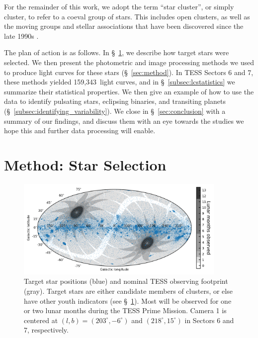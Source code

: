 \documentclass[12pt,twocolumn,tighten,trackchanges]{aastex62}
\newcommand{\numberlcs}{159{,}343\ } %
\begin{document}
For the remainder of this work, we adopt the term ``star cluster'', or
simply cluster, to refer to a coeval group of stars.  This includes
open clusters, as well as the moving groups and stellar associations
that have been discovered since the late 1990s
\citep{zuckerman_young_2004}. 

The plan of action is as follows. In \S~\ref{sec:starselection}, we
describe how target stars were selected. We then present the
photometric and image processing methods we used to produce light
curves for these stars (\S~\ref{sec:method}).  In TESS Sectors 6 and
7, these methods yielded \numberlcs light curves, and in
\S~\ref{subsec:lcstatistics} we summarize their statistical
properties.  We then give an example of how to use the data to identify
pulsating stars, eclipsing binaries, and transiting planets
(\S~\ref{subsec:identifying_variability}).  We close in
\S~\ref{sec:conclusion} with a summary of our findings, and discuss them
with an eye towards the studies we hope this and further data
processing will enable.


\section{Method: Star Selection}
\label{sec:starselection}

\begin{figure}[!t]
	\begin{center}
		\leavevmode
		\includegraphics[width=0.9\textwidth]{target_star_positions.png}
	\end{center}
	\vspace{-0.5cm}
	\caption{
    Target star positions (blue) and nominal TESS observing footprint
    (gray).  Target stars are either candidate members of clusters, or
    else have other youth indicators (see \S~\ref{sec:starselection}).
    Most will be observed for one or two lunar months during the TESS
    Prime Mission.  Camera 1 is centered at $(l,b)=(203^\circ,
    -6^\circ)$ and $(218^\circ,15^\circ)$ in Sectors 6 and 7,
    respectively.
    \label{fig:cdips_targets_positions}
	}
\end{figure}
\end{document}
